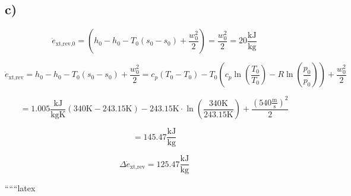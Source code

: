 

\subsection*{c)}

\[
\dot{e}_{\text{xt,rev,0}} = (h_0 - h_0 - T_0 (s_0 - s_0) + \frac{w_0^2}{2}) = \frac{w_0^2}{2} = 20 \frac{\text{kJ}}{\text{kg}}
\]

\[
\dot{e}_{\text{xt,rev}} = h_0 - h_0 - T_0 (s_0 - s_0) + \frac{w_0^2}{2} = c_p (T_0 - T_0) - T_0 (c_p \ln \left(\frac{T_0}{T_0}\right) - R \ln \left(\frac{p_0}{p_0}\right)) + \frac{w_0^2}{2}
\]

\[
= 1.005 \frac{\text{kJ}}{\text{kgK}} (340 \text{K} - 243.15 \text{K}) - 243.15 \text{K} \cdot \ln \left(\frac{340 \text{K}}{243.15 \text{K}}\right) + \frac{(540 \frac{\text{m}}{\text{s}})^2}{2}
\]

\[
= 145.47 \frac{\text{kJ}}{\text{kg}}
\]

\[
\Delta \dot{e}_{\text{xt,rev}} = 125.47 \frac{\text{kJ}}{\text{kg}}
\]

``````latex